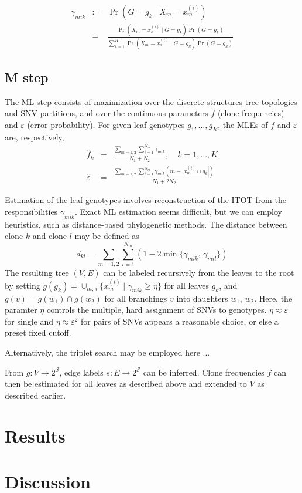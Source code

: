 \documentclass[12pt,a4paper]{amsart}
\newcommand{\eps}{\varepsilon}
\newcommand{\cS}{\mathcal{S}}
\begin{document}
\begin{eqnarray}
	\gamma_{mik} &:=& \Pr(G = g_k \mid X_m = x_m^{(i)})\\
	&=& \frac{\Pr(X_m = x_x^{(i)} \mid G = g_k) \Pr(G = g_k)}
		{\sum_{k=1}^K \Pr(X_m = x_x^{(i)} \mid G = g_k) \Pr(G = g_k)} 
\end{eqnarray} 


\subsection{M step}

The ML step consists of maximization over the discrete structures tree topologies
and SNV partitions, and over the continuous parameters $f$ (clone frequencies)
and $\eps$ (error probability). For given leaf genotypes $g_1, \dots, g_K$, the MLEs of $f$ and $\eps$ are, respectively,
\begin{eqnarray}
	\hat{f}_k &=& \frac{\sum_{m=1,2} \sum_{i=1}^{N_m} \gamma_{mik}}{N_1 + N_2},
		\quad k=1,\dots,K \\[1ex]
	\hat{\eps} &=& \frac{\sum_{m=1,2} \sum_{i=1}^{N_m} \gamma_{mik} (m - |x_m^{(i)} \cap g_k|)}{N_1 + 2N_2}
\end{eqnarray} 

Estimation of the leaf genotypes involves reconstruction of the ITOT from 
the responsibilities $\gamma_{mik}$. Exact ML estimation seems difficult, but we
can employ heuristics, such as distance-based phylogenetic methods.
The distance between clone $k$ and clone $l$ may be defined as
\begin{equation}
	d_{kl} = \sum_{m=1,2} \sum_{i=1}^{N_m} (1 - 2 \min\{\gamma_{mik}, \,\gamma_{mil}\})
\end{equation}
The resulting tree $(V, E)$ can be labeled recursively from the leaves to the
root by setting 
$g(g_k) = \cup_{m,\,i} \{x_m^{(i)} \mid \gamma_{mik} \geq \eta\}$
for all leaves $g_k$, and $g(v) = g(w_1) \cap g(w_2)$ for all branchings
$v$ into daughters $w_1$, $w_2$. 
Here, the paramter $\eta$ controls the multiple, hard assignment of SNVs to genotypes.
$\eta \approx \eps$ for single and $\eta \approx \eps^2$ for pairs of SNVs appears a reasonable choice, or else a preset fixed cutoff.

Alternatively, the triplet search may be employed here ...

From $g : V \to 2^{\cS}$, edge
labels $s : E \to 2^{\cS}$ can be inferred. Clone frequencies
$f$ can then be estimated for all leaves as described above and
extended to $V$ as described earlier. 




\section{Results}


\section{Discussion}




\end{document}
